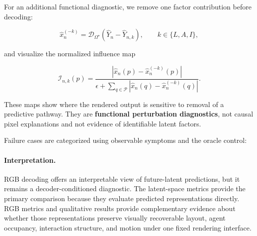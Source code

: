 For an additional functional diagnostic, we remove one factor
contribution before decoding:

\begin{equation*}
\widehat x_n^{(-k)}
=
\mathcal D_{\Omega^\star}
\left(
\widehat Y_n-\widehat Y_{n,k}
\right),
\qquad
k\in\{L,A,I\},
\end{equation*}

and visualize the normalized influence map

\begin{equation*}
\mathcal I_{n,k}(p)
=
\frac{
\left|
\widehat x_n(p)-\widehat x_n^{(-k)}(p)
\right|
}{
\epsilon+
\sum_{q\in\mathcal P}
\left|
\widehat x_n(q)-\widehat x_n^{(-k)}(q)
\right|
}.
\end{equation*}

These maps show where the rendered output is sensitive to removal of a
predictive pathway. They are \textbf{functional perturbation
diagnostics}, not causal pixel explanations and not evidence of
identifiable latent factors.

Failure cases are categorized using observable symptoms and the oracle
control:





\paragraph{Interpretation.}
RGB decoding offers an interpretable view of future-latent predictions,
but it remains a decoder-conditioned diagnostic. The latent-space
metrics provide the primary comparison because they evaluate predicted
representations directly. RGB metrics and qualitative results provide
complementary evidence about whether those representations preserve
visually recoverable layout, agent occupancy, interaction structure,
and motion under one fixed rendering interface.
\fi  %